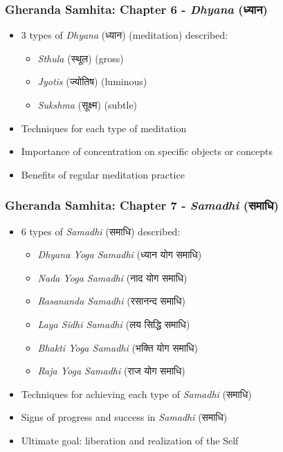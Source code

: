 \begin{frame}[fragile]\frametitle{Gheranda Samhita: Chapter 6 - \textit{Dhyana} (ध्यान)}
\begin{itemize}
    \item 3 types of \textit{Dhyana} (ध्यान) (meditation) described:
    \begin{itemize}
        \item \textit{Sthula} (स्थूल) (gross)
        \item \textit{Jyotis} (ज्योतिष) (luminous)
        \item \textit{Sukshma} (सूक्ष्म) (subtle)
    \end{itemize}
    \item Techniques for each type of meditation
    \item Importance of concentration on specific objects or concepts
    \item Benefits of regular meditation practice
\end{itemize}
\end{frame}

\begin{frame}[fragile]\frametitle{Gheranda Samhita: Chapter 7 - \textit{Samadhi} (समाधि)}
\begin{itemize}
    \item 6 types of \textit{Samadhi} (समाधि) described:
    \begin{itemize}
        \item \textit{Dhyana Yoga Samadhi} (ध्यान योग समाधि)
        \item \textit{Nada Yoga Samadhi} (नाद योग समाधि)
        \item \textit{Rasananda Samadhi} (रसानन्द समाधि)
        \item \textit{Laya Sidhi Samadhi} (लय सिद्धि समाधि)
        \item \textit{Bhakti Yoga Samadhi} (भक्ति योग समाधि)
        \item \textit{Raja Yoga Samadhi} (राज योग समाधि)
    \end{itemize}
    \item Techniques for achieving each type of \textit{Samadhi} (समाधि)
    \item Signs of progress and success in \textit{Samadhi} (समाधि)
    \item Ultimate goal: liberation and realization of the Self
\end{itemize}
\end{frame}



